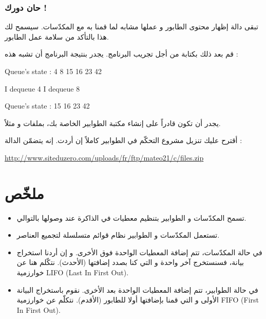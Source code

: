 \subsubsection{حان دورك !}

تبقى دالة إظهار محتوى الطابور
و عملها مشابه لما قمنا به مع المكدّسات. سيسمح لك هذا بالتأكد من سلامة عمل الطابور.

قم بعد ذلك بكتابة
من أجل تجريب البرنامج. يجدر بنتيجة البرنامج أن تشبه هذه :

\begin{Console}
Queue's state :
4 8 15 16 23 42

I dequeue 4
I dequeue 8

Queue's state :
15 16 23 42
\end{Console}

يجدر أن تكون قادراً على إنشاء مكتبة الطوابير الخاصة بك، بملفات
و
مثلاً.

أقترح عليك تنزيل مشروع التحكّم في الطوابير كاملاً إن أردت. إنه يتضمّن الدالة
 :

\url{http://www.siteduzero.com/uploads/fr/ftp/mateo21/c/files.zip}

\section*{ملخّص}

\begin{itemize}
	\item تسمح المكدّسات و الطوابير بتنظيم معطيات في الذاكرة عند وصولها بالتوالي.
	\item تستعمل المكدّسات و الطوابير نظام قوائم متسلسلة لتجميع العناصر.
	\item في حالة المكدّسات، تتم إضافة المعطيات الواحدة فوق الأخرى. و إن أردنا استخراج بيانة، فسنستخرج آخر واحدة و التي كنا بصدد إضافتها (الأحدث). نتكّلم هنا عن خوارزمية 
	\textenglish{LIFO} (\textenglish{Last In First Out}).
	\item في حالة الطوابير، تتم إضافة المعطيات الواحدة بعد الأخرى. نقوم باستخراج البيانة الأولى و التي قمنا بإضافتها أولا للطابور (الأقدم). نتكلّم عن خوارزمية
	\textenglish{FIFO} (\textenglish{First In First Out}).
\end{itemize}
